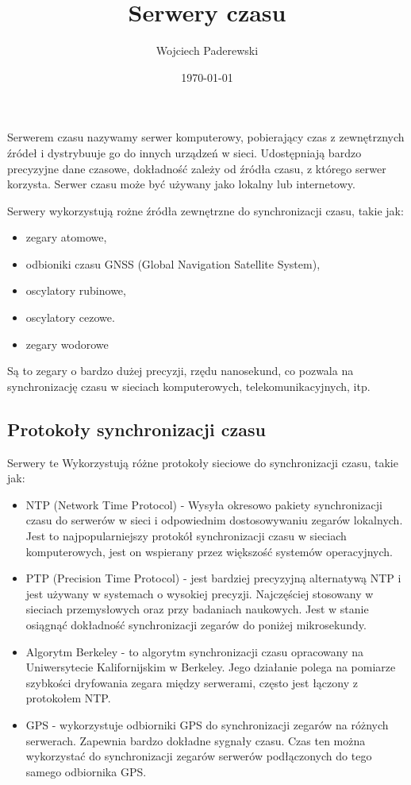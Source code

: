 \documentclass[../main.tex]{subfiles}
\author{Wojciech Paderewski}
\date{\today}
\title{Serwery czasu}
\begin{document}
Serwerem czasu nazywamy serwer komputerowy, pobierający czas z zewnętrznych źródeł i dystrybuuje go do innych urządzeń w sieci\cite{st:serwerczasu-book}.
Udostępniają bardzo precyzyjne dane czasowe, dokładność zależy od źródła czasu, z którego serwer korzysta. Serwer czasu może być używany jako lokalny lub internetowy.

Serwery wykorzystują rożne źródła zewnętrzne do synchronizacji czasu, takie jak:
\begin{itemize}
  \item zegary atomowe,
  \item odbioniki czasu GNSS (Global Navigation Satellite System),
  \item oscylatory rubinowe,
  \item oscylatory cezowe.
  \item zegary wodorowe
\end{itemize}

Są to zegary o bardzo dużej precyzji, rzędu nanosekund, co pozwala na synchronizację czasu w sieciach komputerowych, telekomunikacyjnych, itp.

\subsection{Protokoły synchronizacji czasu}
Serwery te Wykorzystują różne protokoły sieciowe do synchronizacji czasu, takie jak:
\begin{itemize}
  \item NTP (Network Time Protocol) - 
  Wysyła okresowo pakiety synchronizacji czasu do serwerów w sieci i odpowiednim dostosowywaniu zegarów lokalnych.
  Jest to najpopularniejszy protokół synchronizacji czasu w sieciach komputerowych, jest on wspierany przez większość systemów operacyjnych.
  \item PTP (Precision Time Protocol) - 
  jest bardziej precyzyjną alternatywą NTP i jest używany w systemach o wysokiej precyzji. Najczęściej stosowany w sieciach przemysłowych oraz przy badaniach naukowych. 
  Jest w stanie osiągnąć dokładność synchronizacji zegarów do poniżej mikrosekundy.
  \item Algorytm Berkeley - to algorytm synchronizacji czasu opracowany na Uniwersytecie Kalifornijskim w Berkeley. 
  Jego działanie polega na pomiarze szybkości dryfowania zegara między serwerami, często jest łączony z protokołem NTP.
  \item GPS -  wykorzystuje odbiorniki GPS do synchronizacji zegarów na różnych serwerach.
   Zapewnia bardzo dokładne sygnały czasu. Czas ten można wykorzystać do synchronizacji
  zegarów serwerów podłączonych do tego samego odbiornika GPS. 
\end{itemize}
\end{document}
